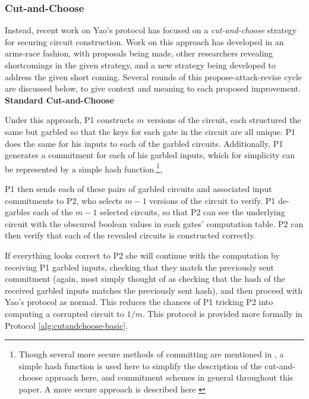 \subsubsection{Cut-and-Choose}

Instead, recent work on Yao's protocol has focused on a \emph{cut-and-choose} strategy for securing circuit construction\cite{malkhi2004fairplay}. Work on this approach has developed in an arms-race fashion, with proposals being made, other researchers revealing shortcomings in the given strategy, and a new strategy being developed to address the given short coming. Several rounds of this propose-attack-revise cycle are discussed below, to give context and meaning to each proposed improvement.\\[.5em]

\noindent\textbf{Standard Cut-and-Choose}

Under this approach, \ac{P1} constructs $m$ versions of the circuit, each structured the same but garbled so that the keys for each gate in the circuit are all unique. \ac{P1} does the same for his inputs to each of the garbled circuits. Additionally, \ac{P1} generates a commitment for each of his garbled inputs, which for simplicity can be represented by a simple hash function.\footnote{Though several more secure methods of committing are mentioned in \cite{lindell2007efficient}, a simple hash function is used here to simplify the description of the cut-and-choose approach here, and commitment schemes in general throughout this paper.  A more secure approach is described here \cite{halevi1996practical}},

\ac{P1} then sends each of these pairs of garbled circuits and associated input commitments to \ac{P2}, who selects $m-1$ versions of the circuit to verify.  \ac{P1} de-garbles each of the $m-1$ selected circuits, so that \ac{P2} can see the underlying circuit with the obscured boolean values in each gates' computation table.  \ac{P2} can then verify that each of the revealed circuits is constructed correctly.

If everything looks correct to \ac{P2} she will continue with the computation by receiving \ac{P1} garbled inputs, checking that they match the previously sent commitment (again, most simply thought of as checking that the hash of the received garbled inputs matches the previously sent hash), and then proceed with Yao's protocol as normal. This reduces the chances of \ac{P1} tricking \ac{P2} into computing a corrupted circuit to $1/m$. This protocol is provided more formally in Protocol \ref{alg:cutandchoose-basic}.

